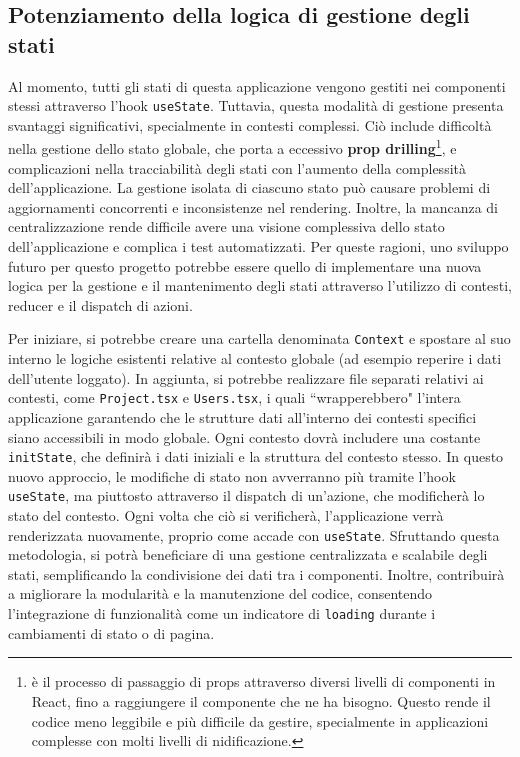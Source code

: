 \documentclass[target=bach,aauheader=,style=]{thud}
\begin{document}
\subsection{Potenziamento della logica di gestione degli stati}
Al momento, tutti gli stati di questa applicazione vengono gestiti nei componenti stessi attraverso l'hook \texttt{useState}. Tuttavia, questa modalità di gestione presenta svantaggi significativi, specialmente in contesti complessi. Ciò include difficoltà nella gestione dello stato globale, che porta a eccessivo \textbf{prop drilling}\footnote{è il processo di passaggio di props attraverso diversi livelli di componenti in React, fino a raggiungere il componente che ne ha bisogno. Questo rende il codice meno leggibile e più difficile da gestire, specialmente in applicazioni complesse con molti livelli di nidificazione.}, e complicazioni nella tracciabilità degli stati con l'aumento della complessità dell'applicazione. La gestione isolata di ciascuno stato può causare problemi di aggiornamenti concorrenti e inconsistenze nel rendering. Inoltre, la mancanza di centralizzazione rende difficile avere una visione complessiva dello stato dell'applicazione e complica i test automatizzati. Per queste ragioni, uno sviluppo futuro per questo progetto potrebbe essere quello di implementare una nuova logica per la gestione e il mantenimento degli stati attraverso l'utilizzo di contesti, reducer e il dispatch di azioni. 

\noindent Per iniziare, si potrebbe creare una cartella denominata \texttt{Context} e spostare al suo interno le logiche esistenti relative al contesto globale (ad esempio reperire i dati dell'utente loggato). In aggiunta, si potrebbe realizzare file separati relativi ai contesti, come \texttt{Project.tsx} e \texttt{Users.tsx}, i quali ``wrapperebbero" l'intera applicazione garantendo che le strutture dati all'interno dei contesti specifici siano accessibili in modo globale. Ogni contesto dovrà includere una costante \texttt{initState}, che definirà i dati iniziali e la struttura del contesto stesso. In questo nuovo approccio, le modifiche di stato non avverranno più tramite l'hook \texttt{useState}, ma piuttosto attraverso il dispatch di un'azione, che modificherà lo stato del contesto. Ogni volta che ciò si verificherà, l'applicazione verrà renderizzata nuovamente, proprio come accade con \texttt{useState}. Sfruttando questa metodologia, si potrà beneficiare di una gestione centralizzata e scalabile degli stati, semplificando la condivisione dei dati tra i componenti. Inoltre, contribuirà a migliorare la modularità e la manutenzione del codice, consentendo l'integrazione di funzionalità come un indicatore di \texttt{loading} durante i cambiamenti di stato o di pagina.
\end{document}
